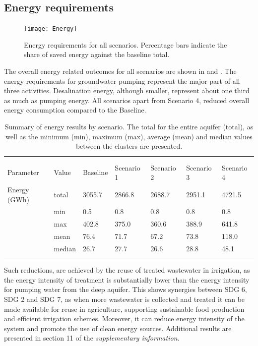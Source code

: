 \subsection{Energy requirements}
\begin{figure}[!b]
\centering
\texttt{[image: Energy]}
\caption{Energy requirements for all scenarios. Percentage bars indicate the share of saved energy against the baseline total.}
\label{fig:energy}
\end{figure}

The overall energy related outcomes for all scenarios are shown in  and . The energy requirements for groundwater pumping represent the major part of all three activities. Desalination energy, although smaller, represent about one third as much as pumping energy. All scenarios apart from Scenario 4, reduced overall energy consumption compared to the Baseline. 

\begin{table}[!ht]
	\caption{\label{tbl:resultsenergy}Summary of energy results by scenario. The total for the entire aquifer (total), as well as the minimum (min), maximum (max), average (mean) and median values between the clusters are presented.}
	\footnotesize
	\lineup
	\begin{tabular*}{\textwidth}{@{}*{7}{l}}
		\br
		&        & \centre{5}{Scenario} \\
		\ns
		&        & \crule{5} \\
		Parameter & Value  &  Baseline &  Scenario 1 &  Scenario 2 &  Scenario 3 &  Scenario 4 \\
		\mr
		Energy (GWh) & total &    3055.7 &      2866.8 &      2688.7 &      2951.1 &      4721.5 \\
         & min &       0.5 &         0.8 &         0.8 &         0.8 &         0.8 \\
         & max &     402.8 &       375.0 &       360.6 &       388.9 &       641.8 \\
         & mean &      76.4 &        71.7 &        67.2 &        73.8 &       118.0 \\
         & median &      26.7 &        27.7 &        26.6 &        28.8 &        48.1 \\
		\br
	\end{tabular*}
\end{table}

Such reductions, are achieved by the reuse of treated wastewater in irrigation, as the energy intensity of treatment is substantially lower than the energy intensity for pumping water from the deep aquifer. This shows synergies between SDG 6, SDG 2 and SDG 7, as when more wastewater is collected and treated it can be made available for reuse in agriculture, supporting sustainable food production and efficient irrigation schemes. Moreover, it can reduce energy intensity of the system and promote the use of clean energy sources. Additional results are presented in section 11 of the \textit{supplementary information}.

